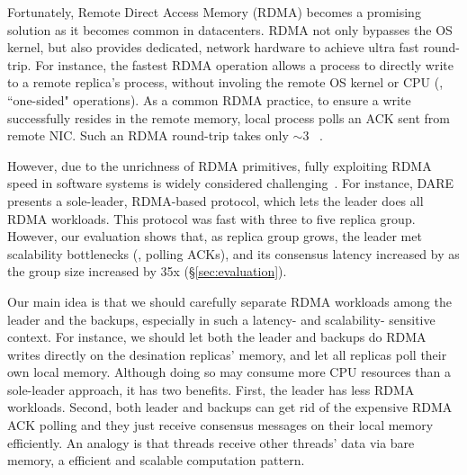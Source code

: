 Fortunately, Remote Direct Access Memory (RDMA) becomes a promising solution
as it becomes common in datacenters. RDMA not only bypasses the OS kernel,
but also provides dedicated, network hardware to achieve ultra fast round-trip.
For instance, the fastest RDMA operation allows a process to directly write to
a remote replica's process, without involing the remote OS kernel or CPU (\ie,
``one-sided" operations). As a common RDMA practice, to ensure a write
successfully resides in the remote memory, local process polls an ACK sent
from remote NIC. Such an RDMA round-trip takes only
$\sim$3 \us~\cite{pilaf:usenix14}.


However, due to the unrichness of RDMA primitives, fully exploiting RDMA
speed in software systems is widely
considered challenging~\cite{pilaf:usenix14,herd:sigcomm14,
farm:sosp15,dare:hpdc15}. For instance, DARE~\cite{dare:hpdc15} presents a
sole-leader, RDMA-based \paxos protocol, which lets the leader does all
RDMA workloads. This protocol was fast with three to five replica group.
However, our evaluation shows that, as replica group grows, the leader met
scalability bottlenecks (\eg, polling ACKs), and its consensus latency
increased by \darescalability as the group size increased by 35x
(\S\ref{sec:evaluation}).



Our main idea is that we should carefully separate RDMA workloads among
the leader and the backups, especially in such a latency- and scalability-
sensitive context. For instance, we should let both the leader and backups
do RDMA writes directly on the desination replicas' memory, and let all
replicas poll their own local memory. Although doing so may consume more CPU
resources than a sole-leader approach, it has two benefits. First, the
leader has less RDMA workloads. Second, both leader and backups can get rid of
the expensive RDMA ACK polling and they just receive consensus messages on their
local memory efficiently. An analogy is that threads receive other threads' data
via bare memory, a efficient and scalable computation pattern.


